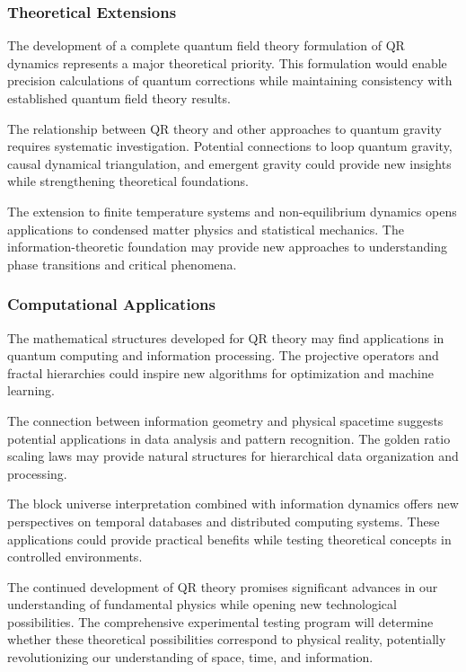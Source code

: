 \subsubsection{Theoretical Extensions}
\label{subsubsec:theoretical-extensions}

The development of a complete quantum field theory formulation of QR dynamics represents a major theoretical priority. This formulation would enable precision calculations of quantum corrections while maintaining consistency with established quantum field theory results.

The relationship between QR theory and other approaches to quantum gravity requires systematic investigation. Potential connections to loop quantum gravity, causal dynamical triangulation, and emergent gravity could provide new insights while strengthening theoretical foundations.

The extension to finite temperature systems and non-equilibrium dynamics opens applications to condensed matter physics and statistical mechanics. The information-theoretic foundation may provide new approaches to understanding phase transitions and critical phenomena.

\subsubsection{Computational Applications}
\label{subsubsec:computational-applications}

The mathematical structures developed for QR theory may find applications in quantum computing and information processing. The projective operators and fractal hierarchies could inspire new algorithms for optimization and machine learning.

The connection between information geometry and physical spacetime suggests potential applications in data analysis and pattern recognition. The golden ratio scaling laws may provide natural structures for hierarchical data organization and processing.

The block universe interpretation combined with information dynamics offers new perspectives on temporal databases and distributed computing systems. These applications could provide practical benefits while testing theoretical concepts in controlled environments.

The continued development of QR theory promises significant advances in our understanding of fundamental physics while opening new technological possibilities. The comprehensive experimental testing program will determine whether these theoretical possibilities correspond to physical reality, potentially revolutionizing our understanding of space, time, and information.